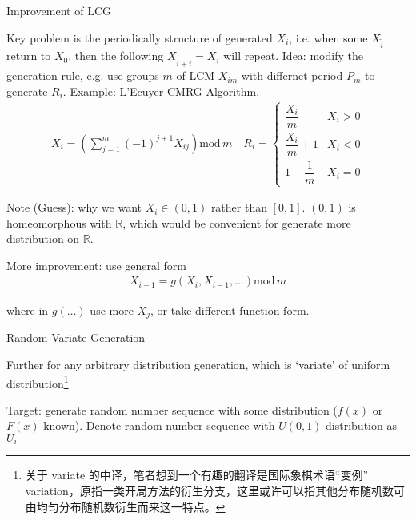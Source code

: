 \begin{point}
    Improvement of LCG
\end{point}

    Key problem is the periodically structure of generated $ X_i $, i.e. when some $ X_{\tilde{i}} $ return to $ X_0 $, then the following $ X_{\tilde{i}+i}=X_i $ will repeat. Idea: modify the generation rule, e.g. use groups $ m $ of LCM $ X_{im} $ with differnet period $ P_m $ to generate $ R_{i} $. Example: L’Ecuyer-CMRG Algorithm.
    \begin{align}
        X_i=\left(\sum_{j=1}^m (-1)^{j+1}X_{ij} \right)\mathrm{mod} \,m  \quad R_i=\begin{cases}
            \dfrac{X_i}{m}&X_i>0\\
            \dfrac{X_i}{m}+1&X_i<0\\
            1-\dfrac{1}{m}&X_i=0
        \end{cases}
    \end{align}
    
    Note (Guess): why we want $ X_i\in (0,1) $ rather than $ [0,1] $. $ (0,1) $ is homeomorphous with $ \mathbb{R}  $, which would be convenient for generate more distribution on $ \mathbb{R} $.
    
    More improvement: use general form 
    \begin{align}
        X_{i+1}=g(X_i,X_{i-1},\ldots)\mathrm{mod}\,m  
    \end{align}
    
    where in $ g(\ldots) $ use more $ X_j $, or take different function form.
    
\begin{point}
    Random Variate Generation
\end{point}

    Further for any arbitrary distribution generation, which is `variate' of uniform distribution\footnote{关于 variate 的中译，笔者想到一个有趣的翻译是国际象棋术语“变例” variation，原指一类开局方法的衍生分支，这里或许可以指其他分布随机数可由均匀分布随机数衍生而来这一特点。}

    Target: generate random number sequence with some distribution ($ f(x) $ or $ F(x) $ known). Denote random number sequence with $ U(0,1) $ distribution as $ U_i $

